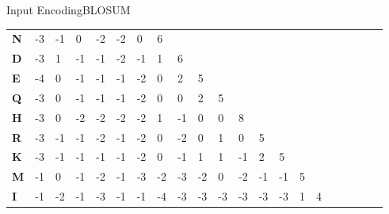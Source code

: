\documentclass[10pt]{beamer}
\newcommand{\1}{
	\setbeamertemplate{background}{
		\texttt{[image: ../img/1]}
		\tikz[overlay] \fill[fill opacity=0.75,fill=white] (0,0) rectangle (-\paperwidth,\paperheight);
	}
}
\begin{document}
\begin{frame}{Input Encoding}{BLOSUM}
\begin{table}[]
{\begin{tabular}{lllllllllllllllllllll}
					\textbf{N} & -3         & -1         & 0          & -2         & -2         & 0          & 6          &            &            &            &            &            &            &            &            &            &            &            &            &            \\
					\textbf{D} & -3         & 1          & -1         & -1         & -2         & -1         & 1          & 6          &            &            &            &            &            &            &            &            &            &            &            &            \\
					\textbf{E} & -4         & 0          & -1         & -1         & -1         & -2         & 0          & 2          & 5          &            &            &            &            &            &            &            &            &            &            &            \\
					\textbf{Q} & -3         & 0          & -1         & -1         & -1         & -2         & 0          & 0          & 2          & 5          &            &            &            &            &            &            &            &            &            &            \\
					\textbf{H} & -3         & 0          & -2         & -2         & -2         & -2         & 1          & -1         & 0          & 0          & 8          &            &            &            &            &            &            &            &            &            \\
					\textbf{R} & -3         & -1         & -1         & -2         & -1         & -2         & 0          & -2         & 0          & 1          & 0          & 5          &            &            &            &            &            &            &            &            \\
					\textbf{K} & -3         & -1         & -1         & -1         & -1         & -2         & 0          & -1         & 1          & 1          & -1         & 2          & 5          &            &            &            &            &            &            &            \\
					\textbf{M} & -1         & 0          & -1         & -2         & -1         & -3         & -2         & -3         & -2         & 0          & -2         & -1         & -1         & 5          &            &            &            &            &            &            \\
					\textbf{I} & -1         & -2         & -1         & -3         & -1         & -1         & -4         & -3         & -3         & -3         & -3         & -3         & -3         & 1          & 4          &            &            &            &            &            \\

\end{tabular}}
\end{table}
\end{frame}
\end{document}

